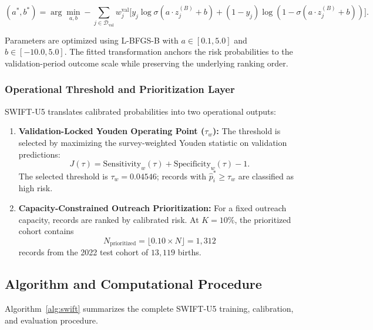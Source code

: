 \documentclass[a4paper,fleqn]{cas-sc}
\begin{document}
\begin{equation}
  (a^*, b^*) = \arg\min_{a, b} - \sum_{j \in \mathcal{D}_{\text{val}}} w_j^{\text{val}} \Big[ y_j \log \sigma(a \cdot z_j^{(B)} + b) + (1 - y_j) \log(1 - \sigma(a \cdot z_j^{(B)} + b)) \Big].
  \label{eq:module_c_opt}
\end{equation}

Parameters are optimized using L-BFGS-B with $a\in[0.1,5.0]$ and $b\in[-10.0,5.0]$. The fitted transformation anchors the risk probabilities to the validation-period outcome scale while preserving the underlying ranking order.

\subsubsection{Operational Threshold and Prioritization Layer}
\label{sec:form_decision_layer}

SWIFT-U5 translates calibrated probabilities into two operational outputs:

\begin{enumerate}
    \item \textbf{Validation-Locked Youden Operating Point ($\tau_w$):} The threshold is selected by maximizing the survey-weighted Youden statistic on validation predictions:
    \[
    J(\tau)=\text{Sensitivity}_w(\tau)+\text{Specificity}_w(\tau)-1.
    \]
    The selected threshold is $\tau_w=0.04546$; records with $\hat{p}_i^*\geq\tau_w$ are classified as high risk.

    \item \textbf{Capacity-Constrained Outreach Prioritization:} For a fixed outreach capacity, records are ranked by calibrated risk. At $K=10\%$, the prioritized cohort contains
    \[
    N_{\text{prioritized}}=\lfloor 0.10\times N\rfloor=1{,}312
    \]
    records from the 2022 test cohort of $13{,}119$ births.
\end{enumerate}

\subsection{Algorithm and Computational Procedure}
\label{sec:swift_algorithm}

Algorithm~\ref{alg:swift} summarizes the complete SWIFT-U5 training, calibration, and evaluation procedure.
\end{document}
